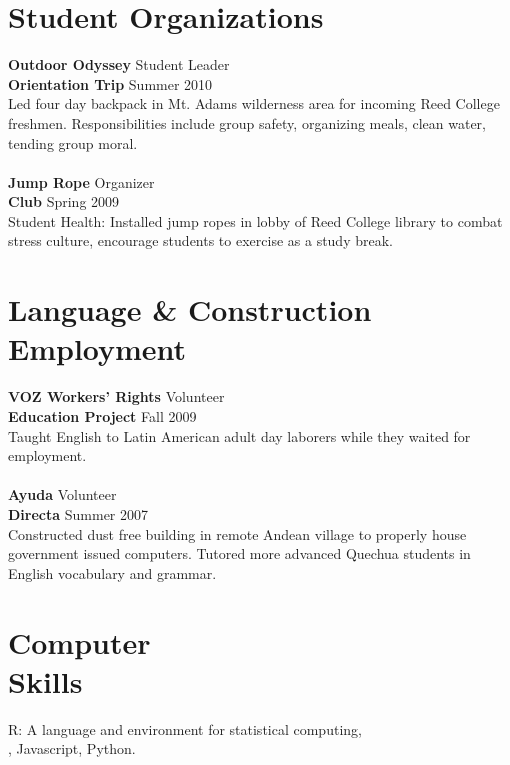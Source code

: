 \documentclass[margin,line]{resume}
\begin{document}
\begin{resume}
\section{\mysidestyle Student Organizations }

\textbf{Outdoor Odyssey} \hfill Student Leader \\
\textbf{Orientation Trip} \hfill Summer 2010 \\
Led four day backpack in Mt. Adams wilderness area for incoming Reed College freshmen. Responsibilities include group safety, organizing meals, clean water, tending group moral.
\\\vspace{-2mm}\\
\textbf{Jump Rope} \hfill Organizer
\\\textbf{Club}  \hfill Spring 2009\\
Student Health: Installed jump ropes in lobby of Reed College library to combat stress culture, encourage students to exercise as a study break. 



	\section{\mysidestyle Language \& Construction \\ Employment}
\textbf{VOZ Workers' Rights}  \hfill Volunteer \\ \textbf{Education Project} \hfill Fall 2009 \\ Taught English to Latin American adult day laborers while they waited for employment. \\
\vspace{-2mm}\\    
\textbf{Ayuda} \hfill Volunteer \\    
\textbf{Directa} \hfill Summer 2007	\\
Constructed dust free building in remote Andean village to properly house government issued computers. Tutored more advanced Quechua students in English vocabulary and grammar.    


    \section{\mysidestyle Computer\\Skills}
 R: A language and environment for statistical computing, \\ \LaTeXe,  Javascript, Python.

\end{resume}
\end{document}
